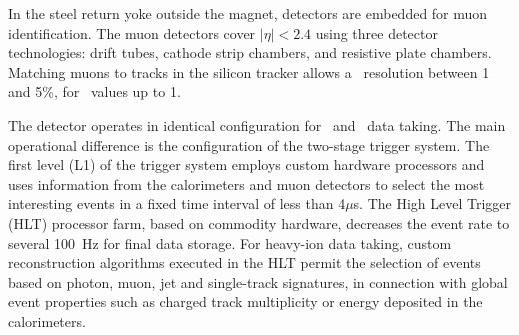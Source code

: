 In the steel return yoke outside the magnet, detectors are embedded for muon identification.
The muon detectors cover $|\eta|< 2.4$ using three detector technologies:
drift tubes, cathode strip chambers, and resistive plate chambers.
Matching muons to tracks in the silicon tracker allows a \pT\ resolution between
1 and 5\%, for \pT\ values up to 1\TeV.

The detector operates in identical configuration for \pp\ and \PbPb\ data taking.
The main operational difference is the configuration of the two-stage trigger system.
The first level (L1) of the trigger system employs custom hardware processors
and  uses information from the calorimeters and muon detectors to select the most
interesting events in a fixed time interval of less than 4$\mu$s.
The High Level Trigger (HLT) processor farm, based on commodity hardware,
decreases the event rate to several 100~Hz for final data storage.
For heavy-ion data taking, custom reconstruction algorithms  executed in
the HLT permit the selection of events based on photon, muon, jet and
single-track signatures, in connection with global event properties such
as charged track multiplicity or energy deposited in the calorimeters.
